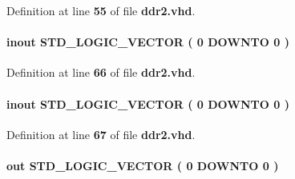 Definition at line {\bf 55} of file {\bf ddr2.\+vhd}.

\paragraph[{mem\+\_\+clk}]{ {\bfseries \textcolor{keywordflow}{inout}\textcolor{vhdlchar}{ }} {\bfseries \textcolor{comment}{S\+T\+D\+\_\+\+L\+O\+G\+I\+C\+\_\+\+V\+E\+C\+T\+OR}\textcolor{vhdlchar}{ }\textcolor{vhdlchar}{(}\textcolor{vhdlchar}{ }\textcolor{vhdlchar}{ } \textcolor{vhdldigit}{0} \textcolor{vhdlchar}{ }\textcolor{keywordflow}{D\+O\+W\+N\+TO}\textcolor{vhdlchar}{ }\textcolor{vhdlchar}{ } \textcolor{vhdldigit}{0} \textcolor{vhdlchar}{ }\textcolor{vhdlchar}{)}\textcolor{vhdlchar}{ }} \hspace{0.3cm}{\ttfamily [Port]}}\label{classddr2_ad18b1719a78b0e3057345b0d58fbdf99}


Definition at line {\bf 66} of file {\bf ddr2.\+vhd}.

\paragraph[{mem\+\_\+clk\+\_\+n}]{ {\bfseries \textcolor{keywordflow}{inout}\textcolor{vhdlchar}{ }} {\bfseries \textcolor{comment}{S\+T\+D\+\_\+\+L\+O\+G\+I\+C\+\_\+\+V\+E\+C\+T\+OR}\textcolor{vhdlchar}{ }\textcolor{vhdlchar}{(}\textcolor{vhdlchar}{ }\textcolor{vhdlchar}{ } \textcolor{vhdldigit}{0} \textcolor{vhdlchar}{ }\textcolor{keywordflow}{D\+O\+W\+N\+TO}\textcolor{vhdlchar}{ }\textcolor{vhdlchar}{ } \textcolor{vhdldigit}{0} \textcolor{vhdlchar}{ }\textcolor{vhdlchar}{)}\textcolor{vhdlchar}{ }} \hspace{0.3cm}{\ttfamily [Port]}}\label{classddr2_acb82ca9a03249fe1ec9968c46cb7ac9a}


Definition at line {\bf 67} of file {\bf ddr2.\+vhd}.

\paragraph[{mem\+\_\+cs\+\_\+n}]{ {\bfseries \textcolor{keywordflow}{out}\textcolor{vhdlchar}{ }} {\bfseries \textcolor{comment}{S\+T\+D\+\_\+\+L\+O\+G\+I\+C\+\_\+\+V\+E\+C\+T\+OR}\textcolor{vhdlchar}{ }\textcolor{vhdlchar}{(}\textcolor{vhdlchar}{ }\textcolor{vhdlchar}{ } \textcolor{vhdldigit}{0} \textcolor{vhdlchar}{ }\textcolor{keywordflow}{D\+O\+W\+N\+TO}\textcolor{vhdlchar}{ }\textcolor{vhdlchar}{ } \textcolor{vhdldigit}{0} \textcolor{vhdlchar}{ }\textcolor{vhdlchar}{)}\textcolor{vhdlchar}{ }} \hspace{0.3cm}{\ttfamily [Port]}}\label{classddr2_acf03476a77ce8202385a29c1c710dde0}


